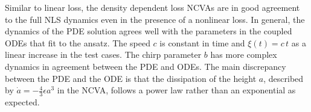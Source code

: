 {%

Similar to linear loss, the density dependent loss NCVAs are in good agreement to the full NLS dynamics even in the presence of a nonlinear loss.  In general, the dynamics of the PDE solution agrees well with the parameters in the coupled ODEs that fit to the ansatz.  The speed $c$ is constant in time and $\xi(t) = c\,t$ as a linear increase in the test cases.  The chirp parameter $b$ has more complex dynamics in agreement between the PDE and ODEs.  The main discrepancy between the PDE and the ODE is that the dissipation of the height $a$, described by $\dot{a} = -\frac{4}{3} \epsilon a^3$ in the NCVA, follows a power law rather than an exponential as expected. 

 
}
